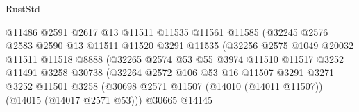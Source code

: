 \begin{lexlean}{RustStd}
\begin{coremodule}
                                      @11486
                                      @2591
                                      @2617
                                      @13
                                      @11511
                                      @11535
                                      @11561
                                      @11585
                                      (@32245
                                        @2576
                                        @2583
                                        @2590
                                        @13
                                        @11511
                                        @11520
                                        @3291
                                        @11535
                                        (@32256
                                          @2575
                                          @1049
                                          @20032
                                          @11511
                                          @11518
                                          @8888
                                          (@32265
                                            @2574
                                            @53
                                            @55
                                            @3974
                                            @11510
                                            @11517
                                            @3252
                                            @11491
                                            @3258
                                            @30738
                                            (@32264
                                              @2572
                                              @106
                                              @53
                                              @16
                                              @11507
                                              @3291
                                              @3271
                                              @3252
                                              @11501
                                              @3258
                                              (@30698
                                                @2571
                                                @11507
                                                (@14010 (@14011 @11507))
                                                (@14015 (@14017 @2571 @53)))
                                              @30665
                                              @14145

\end{coremodule}
\end{lexlean}
